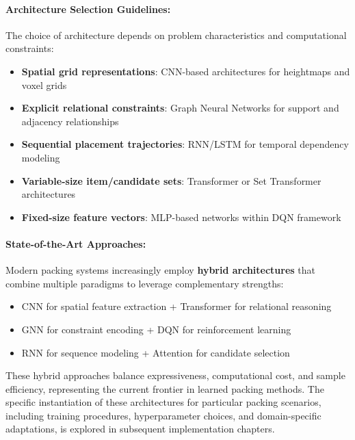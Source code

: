 \paragraph{Architecture Selection Guidelines:}

The choice of architecture depends on problem characteristics and computational constraints:

\begin{itemize}
\item \textbf{Spatial grid representations}: CNN-based architectures for heightmaps and voxel grids
\item \textbf{Explicit relational constraints}: Graph Neural Networks for support and adjacency relationships
\item \textbf{Sequential placement trajectories}: RNN/LSTM for temporal dependency modeling
\item \textbf{Variable-size item/candidate sets}: Transformer or Set Transformer architectures
\item \textbf{Fixed-size feature vectors}: MLP-based networks within DQN framework
\end{itemize}

\paragraph{State-of-the-Art Approaches:}

Modern packing systems increasingly employ \textbf{hybrid architectures} that combine multiple paradigms to leverage complementary strengths:
\begin{itemize}
\item CNN for spatial feature extraction + Transformer for relational reasoning
\item GNN for constraint encoding + DQN for reinforcement learning
\item RNN for sequence modeling + Attention for candidate selection
\end{itemize}

These hybrid approaches balance expressiveness, computational cost, and sample efficiency, representing the current frontier in learned packing methods. The specific instantiation of these architectures for particular packing scenarios, including training procedures, hyperparameter choices, and domain-specific adaptations, is explored in subsequent implementation chapters.
